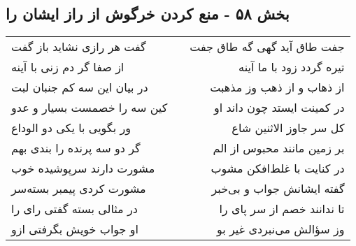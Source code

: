 \begin{center}
\section*{بخش ۵۸ - منع کردن خرگوش از راز ایشان را}
\label{sec:sh058}
\begin{longtable}{l p{0.5cm} r}
گفت هر رازی نشاید باز گفت
&&
جفت طاق آید گهی گه طاق جفت
\\
از صفا گر دم زنی با آینه
&&
تیره گردد زود با ما آینه
\\
در بیان این سه کم جنبان لبت
&&
از ذهاب و از ذهب وز مذهبت
\\
کین سه را خصمست بسیار و عدو
&&
در کمینت ایستد چون داند او
\\
ور بگویی با یکی دو الوداع
&&
کل سر جاوز الاثنین شاع
\\
گر دو سه پرنده را بندی بهم
&&
بر زمین مانند محبوس از الم
\\
مشورت دارند سرپوشیده خوب
&&
در کنایت با غلط‌افکن مشوب
\\
مشورت کردی پیمبر بسته‌سر
&&
گفته ایشانش جواب و بی‌خبر
\\
در مثالی بسته گفتی رای را
&&
تا ندانند خصم از سر پای را
\\
او جواب خویش بگرفتی ازو
&&
وز سؤالش می‌نبردی غیر بو
\\
\end{longtable}
\end{center}
